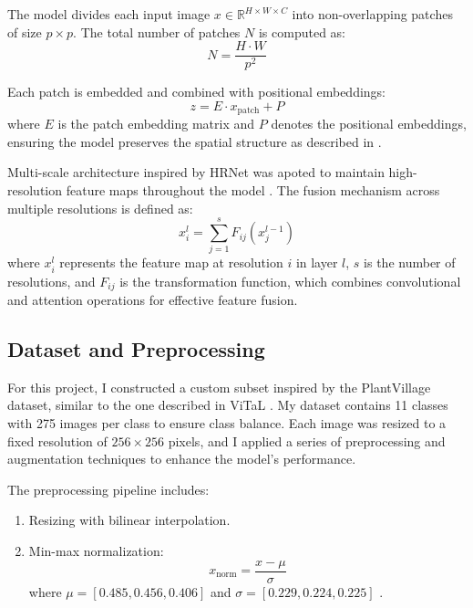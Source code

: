 \documentclass[conference]{IEEEtran}
\begin{document}
The model divides each input image $x \in \mathbb{R}^{H \times W \times C}$ into non-overlapping patches of size $p \times p$. The total number of patches $N$ is computed as:
\begin{equation}
    N = \frac{H \cdot W}{p^2}
\end{equation}

Each patch is embedded and combined with positional embeddings:
\begin{equation}
    z = E \cdot x_{\text{patch}} + P
\end{equation}
where $E$ is the patch embedding matrix and $P$ denotes the positional embeddings, ensuring the model preserves the spatial structure as described in \cite{Dosovitskiy2020}.

Multi-scale architecture inspired by HRNet was apoted to maintain high-resolution feature maps throughout the model \cite{wang2020}. The fusion mechanism across multiple resolutions is defined as:
\begin{equation}
    x^l_i = \sum_{j=1}^s F_{ij}(x^{l-1}_j)
\end{equation}
where $x^l_i$ represents the feature map at resolution $i$ in layer $l$, $s$ is the number of resolutions, and $F_{ij}$ is the transformation function, which combines convolutional and attention operations for effective feature fusion.

\subsection{Dataset and Preprocessing}
For this project, I constructed a custom subset inspired by the PlantVillage dataset, similar to the one described in ViTaL \cite{sebastian2024}. My dataset contains 11 classes with 275 images per class to ensure class balance. Each image was resized to a fixed resolution of $256 \times 256$ pixels, and I applied a series of preprocessing and augmentation techniques to enhance the model's performance.

The preprocessing pipeline includes:
\begin{enumerate}
    \item Resizing with bilinear interpolation.
    \item Min-max normalization:
    \begin{equation}
        x_{\text{norm}} = \frac{x - \mu}{\sigma}
    \end{equation}
    where $\mu = [0.485, 0.456, 0.406]$ and $\sigma = [0.229, 0.224, 0.225]$ \cite{Dosovitskiy2020}.
\end{enumerate}
\end{document}
